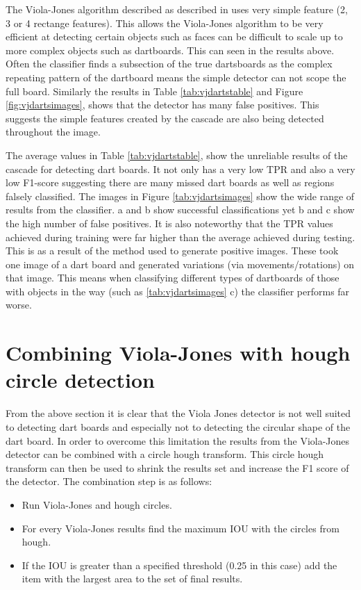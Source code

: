 \documentclass{article}
\begin{document}
\begin{multicols}{2}
The Viola-Jones algorithm described as described in \cite{vj} uses very simple feature (2, 3 or 4 rectange features). This allows the Viola-Jones algorithm to be very efficient at detecting certain objects such as faces can be difficult to scale up to more complex objects such as dartboards. This can seen in the results above. Often the classifier finds a subsection of the true dartsboards as the complex repeating pattern of the dartboard means the simple detector can not scope the full board. Similarly the results in Table \ref{tab:vjdartstable} and Figure \ref{fig:vjdartsimages}, shows that the detector has many false positives. This suggests the simple features created by the cascade are also being detected throughout the image.

The average values in Table \ref{tab:vjdartstable}, show the unreliable results of
the cascade for detecting dart boards.  It not only has a very low TPR and also
a very low F1-score suggesting there are many missed dart boards as well as
regions falsely classified. The images in Figure \ref{tab:vjdartsimages} show
the wide range of results from the classifier. a and b show successful
classifications yet b and c show the high number of false positives. It is also
noteworthy that the TPR values achieved during training were far higher than
the average achieved during testing. This is as a result of the method used to
generate positive images. These took one image of a dart board and generated
variations (via movements/rotations) on that image. This means when classifying
different types of dartboards of those with objects in the way (such as
\ref{tab:vjdartsimages} c) the classifier performs far worse.

\section{Combining Viola-Jones with hough circle detection}

From the above section it is clear that the Viola Jones detector is not well
suited to detecting dart boards and especially not to detecting the circular
shape of the dart board. In order to overcome this limitation the results from
the Viola-Jones detector can be combined with a circle hough transform. This
circle hough transform can then be used to shrink the results set and increase
the F1 score of the detector. The combination step is as follows:

\begin{itemize}
  \item Run Viola-Jones and hough circles.
  \item For every Viola-Jones results find the maximum IOU with the circles
    from hough. 
  \item If the IOU is greater than a specified threshold (0.25 in this case)
    add the item with the largest area to the set of final results.
\end{itemize} 


\end{multicols}
\end{document}
